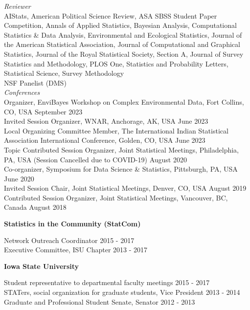 \documentclass[margin,line]{res}
\begin{document}
\begin{resume}
{\em Reviewer} \\
AIStats, American Political Science Review, ASA SBSS Student Paper Competition, Annals of Applied Statistics, Bayesian Analysis, Computational Statistics \& Data Analysis, Environmental and Ecological Statistics, Journal of the American Statistical Association, Journal of Computational and Graphical Statistics, Journal of the Royal Statistical Society, Section A, Journal of Survey Statistics and Methodology, PLOS One, Statistics and Probability Letters, Statistical Science,  Survey Methodology \\

\vspace{-.3cm}
NSF Panelist (DMS) \\

\vspace{-.3cm}
{\em Conferences} \\
Organizer, EnviBayes Workshop on Complex Environmental Data, Fort Collins, CO, USA \hfill {September 2023} \\
Invited Session Organizer, WNAR, Anchorage, AK, USA \hfill {June 2023} \\
Local Organizing Committee Member,  The International Indian Statistical Association International Conference, Golden, CO, USA \hfill {June 2023} \\
Topic Contributed Session Organizer, Joint Statistical Meetings, Philadelphia, PA, USA (Session Cancelled due to COVID-19) \hfill {August 2020} \\
Co-organizer, Symposium for Data Science \& Statistics, Pittsburgh, PA, USA \hfill {June 2020} \\
Invited Session Chair, Joint Statistical Meetings, Denver, CO, USA \hfill {August 2019} \\
Contributed Session Organizer, Joint Statistical Meetings, Vancouver, BC, Canada \hfill {August 2018}

{\bf Statistics in the Community (StatCom)}

\vspace{-.3cm}
Network Outreach Coordinator \hfill {2015 - 2017}\\
Executive Committee, ISU Chapter \hfill {2013 - 2017}

{\bf Iowa State University}

\vspace{-.3cm}
Student representative to departmental faculty meetings \hfill {2015 - 2017}\\
STATers, social organization for graduate students, Vice President \hfill {2013 - 2014}\\
Graduate and Professional Student Senate, Senator \hfill {2012 - 2013}



\end{resume}
\end{document}
